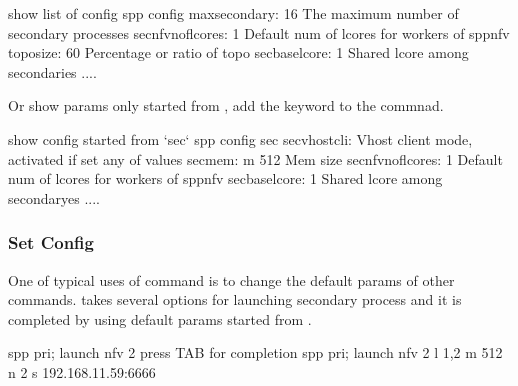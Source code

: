 \documentclass[a4paper,11pt,openany,oneside,english]{sphinxmanual}
\begin{document}
\begin{sphinxVerbatim}[commandchars=\\\{\},formatcom=\footnotesize]
\PYGZsh{} show list of config
spp \PYGZgt{} config
\PYGZhy{} max\PYGZus{}secondary: \PYGZdq{}16\PYGZdq{}       \PYGZsh{} The maximum number of secondary processes
\PYGZhy{} sec\PYGZus{}nfv\PYGZus{}nof\PYGZus{}lcores: \PYGZdq{}1\PYGZdq{}   \PYGZsh{} Default num of lcores for workers of spp\PYGZus{}nfv
\PYGZhy{} topo\PYGZus{}size: \PYGZdq{}60\PYGZpc{}\PYGZdq{}  \PYGZsh{} Percentage or ratio of topo
\PYGZhy{} sec\PYGZus{}base\PYGZus{}lcore: \PYGZdq{}1\PYGZdq{}       \PYGZsh{} Shared lcore among secondaries
....
\end{sphinxVerbatim}

Or show params only started from , add the keyword to the commnad.

\begin{sphinxVerbatim}[commandchars=\\\{\},formatcom=\footnotesize]
\PYGZsh{} show config started from {}`sec\PYGZus{}{}`
spp \PYGZgt{} config sec\PYGZus{}
\PYGZhy{} sec\PYGZus{}vhost\PYGZus{}cli: \PYGZdq{}\PYGZdq{} \PYGZsh{} Vhost client mode, activated if set any of values
\PYGZhy{} sec\PYGZus{}mem: \PYGZdq{}\PYGZhy{}m 512\PYGZdq{} \PYGZsh{} Mem size
\PYGZhy{} sec\PYGZus{}nfv\PYGZus{}nof\PYGZus{}lcores: \PYGZdq{}1\PYGZdq{}   \PYGZsh{} Default num of lcores for workers of spp\PYGZus{}nfv
\PYGZhy{} sec\PYGZus{}base\PYGZus{}lcore: \PYGZdq{}1\PYGZdq{}       \PYGZsh{} Shared lcore among secondaryes
....
\end{sphinxVerbatim}


\subsubsection{Set Config}
\label{\detokenize{commands/common:set-config}}
One of typical uses of  command is to change the default params of
other commands.  takes several options for launching secondary
process and it is completed by using default params started from .

\begin{sphinxVerbatim}[commandchars=\\\{\},formatcom=\footnotesize]
spp \PYGZgt{} pri; launch nfv 2  \PYGZsh{} press TAB for completion
spp \PYGZgt{} pri; launch nfv 2 \PYGZhy{}l 1,2 \PYGZhy{}m 512 \PYGZhy{}\PYGZhy{} \PYGZhy{}n 2 \PYGZhy{}s 192.168.11.59:6666
\end{sphinxVerbatim}
\end{document}
